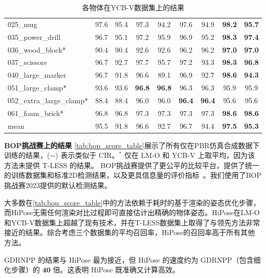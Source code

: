 \begin{table}
{\begin{tabular}{@{}l|c|c|c|c|c|c|c|c@{}}
       025\_mug               & 97.6&  95.4& 97.3& 94.2& 97.6& 94.9         & \textbf{98.2}	&\textbf{95.7}\\
       035\_power\_drill      & 96.7&  95.1& 97.2& 95.9& 96.9& 95.2           & \textbf{98.3}&	\textbf{97.4}\\
       036\_wood\_block*      & 90.4&  90.4& 92.6& 92.6& 96.2& 96.2           & \textbf{97.0}	&\textbf{97.0}\\
       037\_scissors          & 96.7&  92.7& 97.7& 95.7& 97.2& 93.3            &\textbf{98.3}&	\textbf{96.8}\\
       040\_large\_marker     & 96.7&  91.8& 96.6& 89.1& 96.9 &92.7          & \textbf{98.6}	&\textbf{94.3}\\
       051\_large\_clamp*     & 93.6&  93.6&  \textbf{96.8}& \textbf{96.8}& 96.3 &96.3          & 95.9&	95.9\\
       052\_extra\_large\_clamp* & 88.4&  88.4& 96.0& 96.0 &\textbf{96.4}& \textbf{96.4}         & 95.6&	95.6\\
       061\_foam\_brick*          & 96.8&  96.8& 97.3& 97.3& 97.3 &97.3       & \textbf{98.6}	&\textbf{98.6}\\
       \hline
       mean & 95.5&  91.8&  96.6 &92.7& 96.7 &94.4             &\textbf{97.5} &\textbf{95.3} \\
      \bottomrule
    \end{tabular}
    }
    \caption{各物体在YCB-V数据集上的结果}
    \label{tab:ycbv_full_results_AUC}
\end{table}

\textbf{BOP挑战赛上的结果 } \autoref{tab:bop_score_table}展示了所有仅在PBR仿真合成数据下训练的结果，($\sim$) 表示类似于 CIR\cite{lipson2022coupled}。$^*$ 仅在 LM-O 和 YCB-V 上取平均，因为该方法未提供 T-LESS 的结果。 BOP挑战赛提供了更公平的比较平台，提供了统一的训练数据集和标准2D检测结果，以及更具信息量的评价指标~\cite{hodan2018bop}。我们使用了BOP挑战赛2023提供的默认检测结果。



大多数在\autoref{tab:bop_score_table}中的方法依赖于耗时的基于渲染的姿态优化步骤，而HiPose无需任何渲染对比过程即可直接估计出精确的物体姿态。HiPose在LM-O和YCB-V数据集上超越了现有技术，并在T-LESS数据集上取得了与领先方法非常接近的结果。综合考虑三个数据集的平均召回率，HiPose的召回率高于所有其他方法。

GDRNPP\cite{liu2022gdrnpp_bop} 的结果与 HiPose 最为接近，但 HiPose 的速度约为 GDRNPP（包含细化步骤）的 $\mathbf{40}$ 倍。这表明 HiPose 既准确又计算高效。

